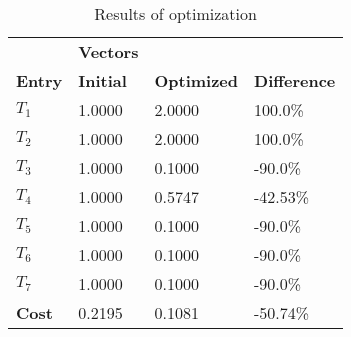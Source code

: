 \begin{table}[H]
\centering
\begin{tabular}{llll}
\textbf{}      & \cellcolor[HTML]{EFEFEF}\textbf{Vectors} & \textbf{} & \textbf{}         \\
\rowcolor[HTML]{EFEFEF} 
\textbf{Entry} & \textbf{Initial} & \textbf{Optimized} & \textbf{Difference} \\
$T_1$ & 1.0000 & 2.0000 & 100.0\% \\ 
$T_2$ & 1.0000 & 2.0000 & 100.0\% \\ 
$T_3$ & 1.0000 & 0.1000 & -90.0\% \\ 
$T_4$ & 1.0000 & 0.5747 & -42.53\% \\ 
$T_5$ & 1.0000 & 0.1000 & -90.0\% \\ 
$T_6$ & 1.0000 & 0.1000 & -90.0\% \\ 
$T_7$ & 1.0000 & 0.1000 & -90.0\% \\ 
\rowcolor[HTML]{EFEFEF} 
\textbf{Cost}  & 0.2195 & 0.1081 & -50.74\% \\ 
\end{tabular}
\caption{Results of optimization}
\label{tab:OptimizationAnalysis}
\end{table}